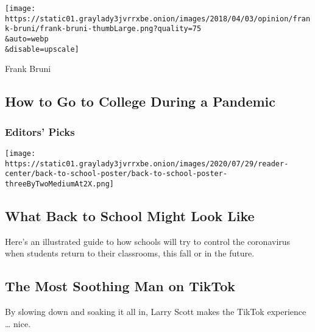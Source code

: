 \href{/2020/08/01/opinion/sunday/minerva-college-coronavirus.html}{}

\texttt{[image: https://static01.graylady3jvrrxbe.onion/images/2018/04/03/opinion/frank-bruni/frank-bruni-thumbLarge.png?quality=75\\\&auto=webp\\\&disable=upscale]}

Frank Bruni

\hypertarget{how-to-go-to-college-during-a-pandemic}{%
\subsection{How to Go to College During a
Pandemic}\label{how-to-go-to-college-during-a-pandemic}}

\hypertarget{editors-picks}{%
\subsubsection{Editors' Picks}\label{editors-picks}}

\href{/interactive/2020/07/29/us/schools-reopening-coronavirus.html}{}

\texttt{[image: https://static01.graylady3jvrrxbe.onion/images/2020/07/29/reader-center/back-to-school-poster/back-to-school-poster-threeByTwoMediumAt2X.png]}

\href{/interactive/2020/07/29/us/schools-reopening-coronavirus.html}{}

\hypertarget{what-back-to-school-might-look-like}{%
\subsection{What Back to School Might Look
Like}\label{what-back-to-school-might-look-like}}

Here's an illustrated guide to how schools will try to control the
coronavirus when students return to their classrooms, this fall or in
the future.

\href{/2020/07/31/arts/larry-scott-tiktok-larryakumpo.html}{}

\hypertarget{the-most-soothing-man-on-tiktok}{%
\subsection{The Most Soothing Man on
TikTok}\label{the-most-soothing-man-on-tiktok}}

By slowing down and soaking it all in, Larry Scott makes the TikTok
experience \ldots{} nice.

\href{/2020/07/31/arts/larry-scott-tiktok-larryakumpo.html}{}

